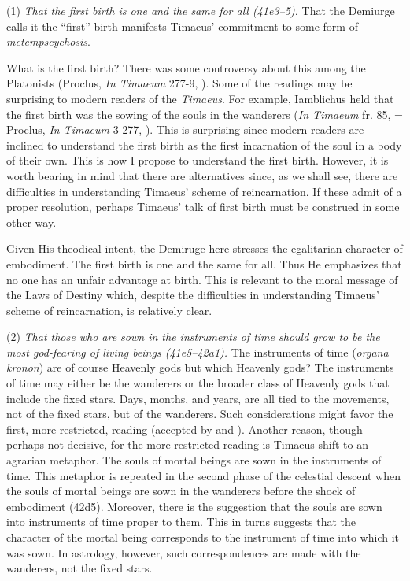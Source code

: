 (1) \emph{That the first birth is one and the same for all (41e3--5).} That the Demiurge calls it the ``first'' birth manifests Timaeus' commitment to some form of \emph{metempscychosis}.

What is the first birth? There was some controversy about this among the Platonists (Proclus, \emph{In Timaeum} 277-9, \citealt{Diehl:1903re}). Some of the readings may be surprising to modern readers of the \emph{Timaeus}. For example, Iamblichus held that the first birth was the sowing of the souls in the wanderers (\emph{In Timaeum} fr. 85, \citealt{Dillon:1973qv} = Proclus, \emph{In Timaeum} 3 277, \citealt{Diehl:1903re}). This is surprising since modern readers are inclined to understand the first birth as the first incarnation of the soul in a body of their own. This is how I propose to understand the first birth. However, it is worth bearing in mind that there are alternatives since, as we shall see, there are difficulties in understanding Timaeus' scheme of reincarnation. If these admit of a proper resolution, perhaps Timaeus' talk of first birth must be construed in some other way.

Given His theodical intent, the Demiruge here stresses the egalitarian character of embodiment. The first birth is one and the same for all. Thus He emphasizes that no one has an unfair advantage at birth. This is relevant to the moral message of the Laws of Destiny which, despite the difficulties in understanding Timaeus' scheme of reincarnation, is relatively clear.

(2) \emph{That those who are sown in the instruments of time should grow to be the most god-fearing of living beings (41e5--42a1).} The instruments of time (\emph{organa kronōn}) are of course Heavenly gods but which Heavenly gods? The instruments of time may either be the wanderers or the broader class of Heavenly gods that include the fixed stars. Days, months, and years, are all tied to the movements, not of the fixed stars, but of the wanderers. Such considerations might favor the first, more restricted, reading (accepted by \citealt[143 n4]{Archer-Hind:1888qd} and \citealt[258--9]{Taylor:1928qb}). Another reason, though perhaps not decisive, for the more restricted reading is Timaeus shift to an agrarian metaphor. The souls of mortal beings are sown in the instruments of time. This metaphor is repeated in the second phase of the celestial descent when the souls of mortal beings are sown in the wanderers before the shock of embodiment (42d5). Moreover, there is the suggestion that the souls are sown into instruments of time proper to them. This in turns suggests that the character of the mortal being corresponds to the instrument of time into which it was sown. In astrology, however, such correspondences are made with the wanderers, not the fixed stars.

